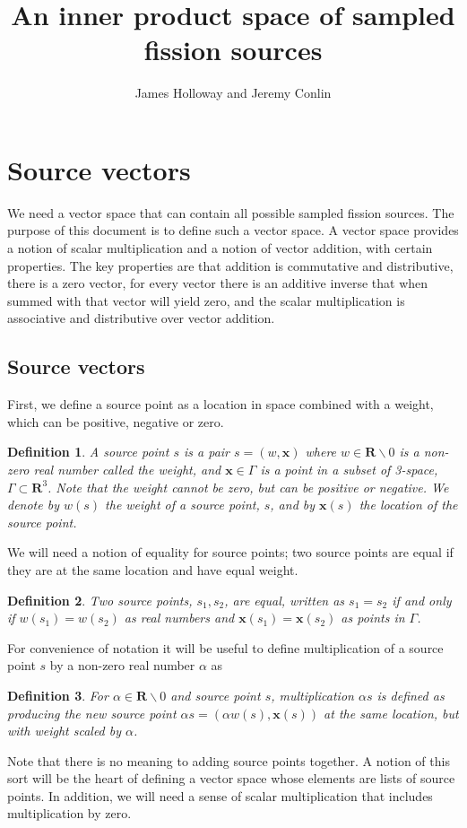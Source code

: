 \documentclass[12pt]{article}
\title{An inner product space of sampled fission sources}
\author{James Holloway and Jeremy Conlin}
\newtheorem{definition}{Definition}
\begin{document}
\maketitle

\section{Source vectors}

We need a vector space that can contain all possible sampled fission sources.  The purpose of this document is to define such a vector space.  A vector space provides a notion of scalar multiplication and a notion of vector addition, with certain properties.  The key properties are that addition is commutative and distributive, there is a zero vector, for every vector there is an additive inverse that when summed with that vector will yield zero, and the scalar multiplication is associative and distributive over vector addition.

\subsection{Source vectors}

First, we define a source point as a location in space combined with a weight, which can be positive, negative or zero.
\begin{definition} A \emph{source point} $s$ is a pair $s = (w, \mathbf{x})$ where $w \in \mathbf{R}\backslash0$ is a non-zero real number called the \emph{weight}, and $\mathbf{x} \in \Gamma$ is a point in a subset of 3-space, $\Gamma \subset \mathbf{R}^3$.  Note that the weight cannot be zero, but can be positive or negative.   We denote by $w(s)$ the weight of a source point, $s$, and by $\mathbf{x}(s)$ the location of the source point. 
\end{definition}
We will need a notion of equality for source points; two source points are equal if they are at the same location and have equal weight.
\begin{definition}
Two source points, $s_1, s_2$, are equal, written as $s_1 = s_2$ if and only if $w(s_1) = w(s_2)$ as real numbers and $\mathbf{x}(s_1) = \mathbf{x}(s_2)$ as points in $\Gamma$.  
\end{definition}
For convenience of notation it will be useful to define multiplication of a source point $s$ by a non-zero real number $\alpha$ as
\begin{definition}
For $\alpha \in \mathbf{R}\backslash 0$ and source point $s$, multiplication $\alpha s$ is defined as producing the new source point $\alpha s = (\alpha w(s), \mathbf{x}(s))$ at the same location, but with weight scaled by $\alpha$.
\end{definition}
Note that there is no meaning to adding source points together.  A notion of this sort will be the heart of defining a vector space whose elements are lists of source points. In addition, we will need a sense of scalar multiplication that includes multiplication by zero.
\end{document}
